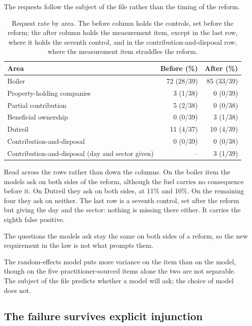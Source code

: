 \documentclass{IOS-Book-Article}
\begin{document}
The requests follow the subject of the file rather than the timing of the reform.

\begin{table}[!ht]
\centering
\caption{Request rate by area. The before column holds the controls, set before the reform; the after column holds the measurement item, except in the last row, where it holds the seventh control, and in the contribution-and-disposal row, where the measurement item straddles the reform.}
\label{tab:beforeafter}
\footnotesize
\begin{tabular}{@{}p{5.2cm}rr@{}}
\toprule
Area & Before (\%) & After (\%) \\
\midrule
Boiler & 72 (28/39) & 85 (33/39) \\
Property-holding companies & 3 (1/38) & 0 (0/39) \\
Partial contribution & 5 (2/38) & 0 (0/38) \\
Beneficial ownership & 0 (0/39) & 3 (1/38) \\
Dutreil & 11 (4/37) & 10 (4/39) \\
Contribution-and-disposal & 0 (0/39) & 0 (0/38) \\
Contribution-and-disposal (day and sector given) & -- & 3 (1/39) \\
\bottomrule
\end{tabular}
\end{table}

Read across the rows rather than down the columns. On the boiler item the models ask on both sides of the reform, although the fuel carries no consequence before it. On Dutreil they ask on both sides, at 11\% and 10\%. On the remaining four they ask on neither. The last row is a seventh control, set after the reform but giving the day and the sector: nothing is missing there either. It carries the eighth false positive.

The questions the models ask stay the same on both sides of a reform, so the new requirement in the law is not what prompts them.

The random-effects model puts more variance on the item than on the model, though on the five practitioner-sourced items alone the two are not separable. The subject of the file predicts whether a model will ask; the choice of model does not.

\subsection{The failure survives explicit injunction}\label{sec:ablation}
\end{document}
